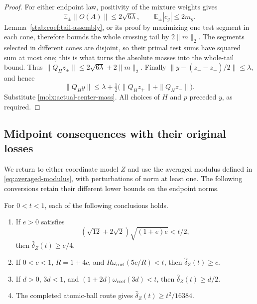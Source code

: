 \begin{proof}
For either endpoint law, positivity of the mixture weights gives
\[
 \mathbb E_\pm\|O(A)\|\le2\sqrt{6\lambda},\qquad
 \mathbb E_\pm|c_g|\le2m_g.
\]
Lemma~\ref{stab:coef:tail-assembly}, or its proof by maximizing
one test segment in each cone, therefore bounds the whole crossing
tail by $2\|m\|_2$.  The segments selected in different cones
are disjoint, so their primal test sums have squared sum at most
one; this is what turns the absolute masses into the whole-tail
bound.  Thus
$\|Q_Hz_\pm\|\le2\sqrt{6\lambda}+2\|m\|_2$.
Finally
$\|y-(z_+-z_-)/2\|\le\lambda$, and hence
\[
 \|Q_Hy\|\le\lambda+
 \tfrac12\bigl(\|Q_Hz_+\|+\|Q_Hz_-\|\bigr).
\]
Substitute \eqref{molx:actual-center-mass}.  All choices of $H$
and $p$ preceded $y$, as required.
\end{proof}


\subsection{Midpoint consequences with their original losses}
\label{stab:coef:moduli}

We return to either coordinate model $Z$ and use the averaged modulus defined in \eqref{eq:averaged-modulus},
with perturbations of norm at least one. The following conversions
retain their different lower bounds on the endpoint norms.

\begin{proposition}\label{stab:coef:modulus-conversions}
For $0<t<1$, each of the following conclusions holds.
\begin{enumerate}
\item If $e>0$ satisfies
\[
 (\sqrt{12}+2\sqrt2)\sqrt{(1+e)e}<t/2,
\]
then $\widehat\delta_Z(t)\ge e/4$.
\item If $0<c<1$, $R=1+4c$, and $R\omega_{\mathrm{coef}}(5c/R)<t$, then
$\widehat\delta_Z(t)\ge c$.
\item If $d>0$, $3d<1$, and $(1+2d)\omega_{\mathrm{coef}}(3d)<t$, then
$\widehat\delta_Z(t)\ge d/2$.
\item The completed atomic-ball route gives
$\widehat\delta_Z(t)\ge t^2/16384$.
\end{enumerate}
\end{proposition}

